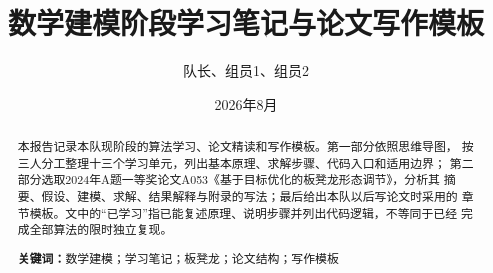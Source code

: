 \documentclass[UTF8,zihao=-4]{ctexart}
\title{\bfseries 数学建模阶段学习笔记与论文写作模板}
\author{队长、组员1、组员2}
\date{2026年8月}
\begin{document}
\maketitle

\begin{abstract}
本报告记录本队现阶段的算法学习、论文精读和写作模板。第一部分依照思维导图，
按三人分工整理十三个学习单元，列出基本原理、求解步骤、代码入口和适用边界；
第二部分选取2024年A题一等奖论文A053《基于目标优化的板凳龙形态调节》，分析其
摘要、假设、建模、求解、结果解释与附录的写法；最后给出本队以后写论文时采用的
章节模板。文中的“已学习”指已能复述原理、说明步骤并列出代码逻辑，不等同于已经
完成全部算法的限时独立复现。

\par\noindent\textbf{关键词：}数学建模；学习笔记；板凳龙；论文结构；写作模板
\end{abstract}

\tableofcontents
\newpage
\end{document}
